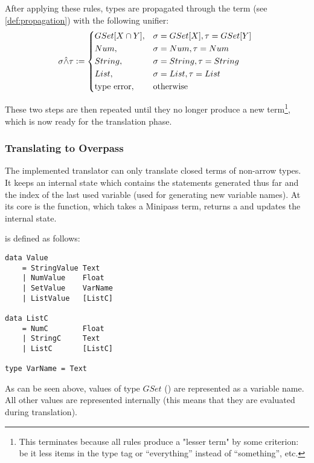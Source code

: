 \documentclass[main.tex]{subfiles}
\begin{document}
After applying these rules, types are propagated through the term
(see \cref{def:propagation}) with the following unifier:
\[
    \sigma \unify \tau \defeq
    \begin{cases*}
        GSet[X \cap Y] ,& $\sigma = GSet[X], \tau = GSet[Y]$ \\
        Num ,& $\sigma = Num, \tau = Num$ \\
        String ,& $\sigma = String, \tau = String$ \\
        List ,& $\sigma = List, \tau = List$ \\
        \text{type error} ,& otherwise \\
    \end{cases*}
\]

These two steps are then repeated until they no longer produce a new term\footnote{
    This terminates because all rules produce a "lesser term" by some criterion:
    be it less items in the type tag or ``everything'' instead of ``something'', etc.
}, which is now ready for the translation phase.


\subsubsection{Translating to Overpass}\label{sec:translation}
The implemented translator can only translate closed terms of non-arrow types.
It keeps an internal state which contains the statements generated thus far
and the index of the last used variable (used for generating new variable
names).
At its core is the  function, which takes a Minipass term,
returns a  and updates the internal state.

 is defined as follows:
\begin{lstlisting}
data Value
    = StringValue Text
    | NumValue    Float
    | SetValue    VarName
    | ListValue   [ListC]

data ListC
    = NumC        Float
    | StringC     Text
    | ListC       [ListC]

type VarName = Text
\end{lstlisting}

As can be seen above, values of type $GSet$ () are represented
as a variable name. All other values are represented internally (this means
that they are evaluated during translation).
\end{document}
